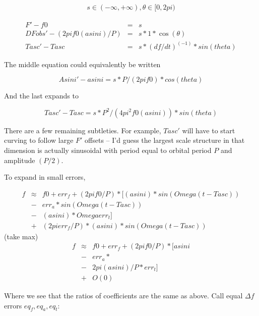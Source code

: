 \documentclass{article}
\begin{document}
\begin{eqnarray}
s \in (-\infty, +\infty), \theta \in [0, 2 pi)
\end{eqnarray}

\begin{eqnarray}
F' - f0                        &=& s\\
DFobs' - (2 pi f0 (a sin i)/P) &=& s * 1 * \cos(\theta)\\
Tasc' - Tasc                   &=& s * (df/dt)^(-1) * sin(theta)
\end{eqnarray}

The middle equation could equivalently be written

\begin{equation}
Asini' - a sin i = s * P/(2 pi f0) * cos(theta)
\end{equation}

And the last expands to

\begin{equation}
Tasc' - Tasc     = s * P^2/(4 pi^2 f0 (a sin i)) * sin(theta)
\end{equation}

There are a few remaining subtleties. For example, $Tasc'$ will have to
start curving to follow large $F'$ offsets -- I'd guess the largest scale
structure in that dimension is actually sinusoidal with period equal to
orbital period $P$ and amplitude $(P/2)$.

To expand in small errors,

\begin{eqnarray}
f &\approx& f0 + err_f + (2pi f0/P)*[
                     (a sin i)*sin(Omega(t-Tasc)) \\
                   &-& err_a * sin(Omega(t-Tasc)) \\
                   &-& (a sin i) * Omega err_t] \\
                   &+& (2pi err_f/P)*(a sin i)*sin(Omega(t-Tasc))
\end{eqnarray}
  (take max)
\begin{eqnarray}
f &\approx& f0 + err_f + (2pi f0/P)*[
                     a sin i \\ 
                   &-& err_a * \\
                   &-& 2 pi (a sin i)/P * err_t] \\
                   &+& O(0)
\end{eqnarray}

Where we see that the ratios of coefficients are the same as above. Call
equal $\Delta f$ errors $eq_f, eq_a, eq_t$:
\end{document}
